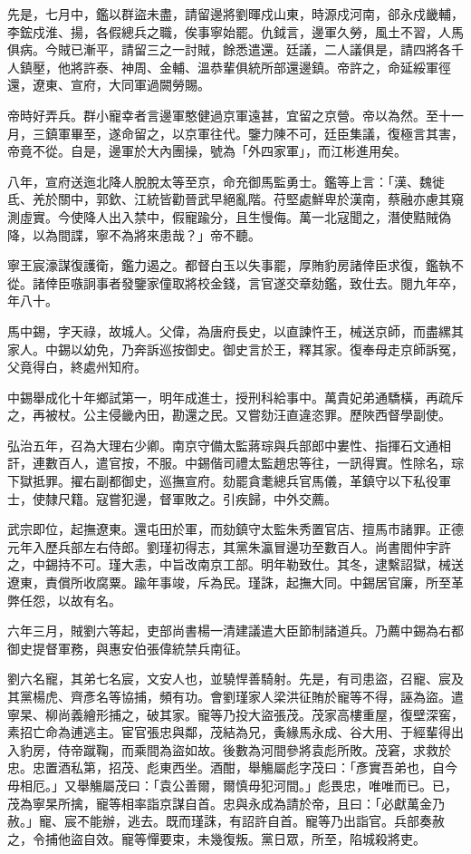 \begin{pinyinscope}
先是，七月中，鑑以群盜未盡，請留邊將劉暉戍山東，時源戍河南，郤永戍畿輔，李鋐戍淮、揚，各假總兵之職，俟事寧始罷。仇鉞言，邊軍久勞，風土不習，人馬俱病。今賊已漸平，請留三之一討賊，餘悉遣還。廷議，二人議俱是，請四將各千人鎮壓，他將許泰、神周、金輔、溫恭輩俱統所部還邊鎮。帝許之，命延綏軍徑還，遼東、宣府，大同軍過闕勞賜。

帝時好弄兵。群小寵幸者言邊軍憨健過京軍遠甚，宜留之京營。帝以為然。至十一月，三鎮軍畢至，遂命留之，以京軍往代。鑒力陳不可，廷臣集議，復極言其害，帝竟不從。自是，邊軍於大內團操，號為「外四家軍」，而江彬進用矣。

八年，宣府送迤北降人脫脫太等至京，命充御馬監勇士。鑑等上言：「漢、魏徙氐、羌於關中，郭欽、江統皆勸晉武早絕亂階。苻堅處鮮卑於漢南，蔡融亦慮其窺測虛實。今使降人出入禁中，假寵踰分，且生慢侮。萬一北寇聞之，潛使黠賊偽降，以為間諜，寧不為將來患哉？」帝不聽。

寧王宸濠謀復護衛，鑑力遏之。都督白玉以失事罷，厚賄豹房諸倖臣求復，鑑執不從。諸倖臣嗾詗事者發鑒家僮取將校金錢，言官遂交章劾鑑，致仕去。閱九年卒，年八十。

馬中錫，字天祿，故城人。父偉，為唐府長史，以直諫忤王，械送京師，而盡縲其家人。中錫以幼免，乃奔訴巡按御史。御史言於王，釋其家。復奉母走京師訴冤，父竟得白，終處州知府。

中錫舉成化十年鄉試第一，明年成進士，授刑科給事中。萬貴妃弟通驕橫，再疏斥之，再被杖。公主侵畿內田，勘還之民。又嘗劾汪直違恣罪。歷陜西督學副使。

弘治五年，召為大理右少卿。南京守備太監蔣琮與兵部郎中婁性、指揮石文通相訐，連數百人，遣官按，不服。中錫偕司禮太監趙忠等往，一訊得實。性除名，琮下獄抵罪。擢右副都御史，巡撫宣府。劾罷貪耄總兵官馬儀，革鎮守以下私役軍士，使隸尺籍。寇嘗犯邊，督軍敗之。引疾歸，中外交薦。

武宗即位，起撫遼東。還屯田於軍，而劾鎮守太監朱秀置官店、擅馬市諸罪。正德元年入歷兵部左右侍郎。劉瑾初得志，其黨朱瀛冒邊功至數百人。尚書閻仲宇許之，中錫持不可。瑾大恚，中旨改南京工部。明年勒致仕。其冬，逮繫詔獄，械送遼東，責償所收腐粟。踰年事竣，斥為民。瑾誅，起撫大同。中錫居官廉，所至革弊任怨，以故有名。

六年三月，賊劉六等起，吏部尚書楊一清建議遣大臣節制諸道兵。乃薦中錫為右都御史提督軍務，與惠安伯張偉統禁兵南征。

劉六名寵，其弟七名宸，文安人也，並驍悍善騎射。先是，有司患盜，召寵、宸及其黨楊虎、齊彥名等協捕，頻有功。會劉瑾家人梁洪征賄於寵等不得，誣為盜。遣寧杲、柳尚義繪形捕之，破其家。寵等乃投大盜張茂。茂家高樓重屋，復壁深窖，素招亡命為逋逃主。宦官張忠與鄰，茂結為兄，夤緣馬永成、谷大用、于經輩得出入豹房，侍帝蹴鞠，而乘間為盜如故。後數為河間參將袁彪所敗。茂窘，求救於忠。忠置酒私第，招茂、彪東西坐。酒酣，舉觴屬彪字茂曰：「彥實吾弟也，自今毋相厄。」又舉觴屬茂曰：「袁公善爾，爾慎毋犯河間。」彪畏忠，唯唯而已。已，茂為寧杲所擒，寵等相率詣京謀自首。忠與永成為請於帝，且曰：「必獻萬金乃赦。」寵、宸不能辦，逃去。既而瑾誅，有詔許自首。寵等乃出詣官。兵部奏赦之，令捕他盜自效。寵等憚要束，未幾復叛。黨日眾，所至，陷城殺將吏。


\end{pinyinscope}
